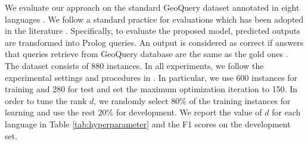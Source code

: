 \documentclass[11pt,a4paper]{article}
\begin{document}
{{We evaluate our approach on the standard GeoQuery dataset annotated in eight languages \cite{WongYW:06,Jones:12,Rhs:17}.
We follow a standard practice for evaluations which has been adopted in the literature \cite{Luw:14,Luw:15,Rhs:17}.
Specifically, to evaluate the proposed model, predicted outputs are transformed into Prolog queries.
An output is considered as correct if answers that queries retrieve from GeoQuery database are the same as the gold ones .
The dataset consists of 880 instances.
In all experiments, we follow the experimental settings and procedures in \cite{Luw:14,Luw:15,Rhs:17}.
In particular, we use 600 instances for training and 280 for test and set the maximum optimization iteration to 150.
In order to tune the rank $d$, we randomly select 80\% of the training instances for learning and use the rest 20\% for development.
We report the value of $d$ for each language in Table \ref{tab:hyperparameter} and the F1 scores on the development set.
%
%		
}}
\end{document}
